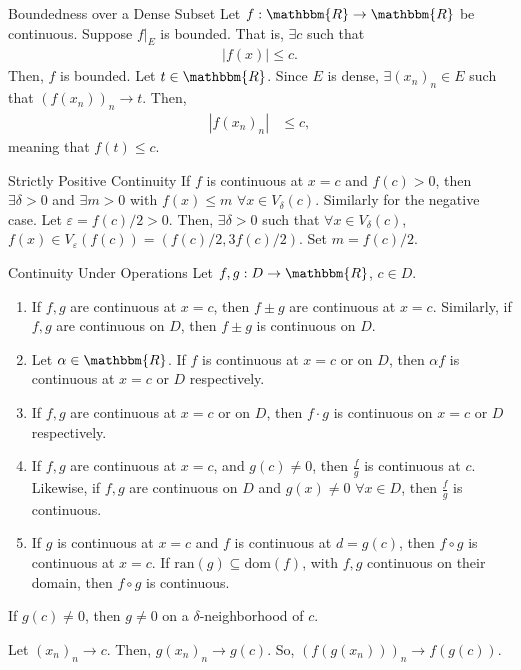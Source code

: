 \documentclass[10pt]{extarticle}
\newcommand{\R}{\mathbbm{R}}
\begin{document}
  \begin{problem}{Boundedness over a Dense Subset}
    Let $f: \R \rightarrow \R$ be continuous. Suppose $f\vert_{E}$ is bounded. That is, $\exists c$ such that
    \begin{align*}
      |f(x)| \leq c.\tag*{$\forall x\in E$}
    \end{align*}
    Then, $f$ is bounded.
    \tcblower
    Let $t\in \R$. Since $E$ is dense, $\exists (x_n)_n \in E$ such that $(f(x_n))_n \rightarrow t$. Then,
    \begin{align*}
      |f(x_n)_n| &\leq c,
    \end{align*}
    meaning that $f(t) \leq c$.
  \end{problem}
  \begin{problem}{Strictly Positive Continuity}
    If $f$ is continuous at $x=c$ and $f(c) > 0$, then $\exists \delta > 0$ and $\exists m > 0$ with $f(x) \leq m$ $\forall x \in V_{\delta}(c)$. Similarly for the negative case.
    \tcblower
    Let $\varepsilon = f(c) / 2 > 0$. Then, $\exists \delta > 0$ such that $\forall x\in V_{\delta}(c)$, $f(x)\in V_{\varepsilon}(f(c)) = (f(c)/2,3f(c)/2)$. Set $m = f(c)/2$. 
  \end{problem}
  \begin{problem}{Continuity Under Operations}
    Let $f,g: D\rightarrow \R$, $c\in D$.
    \begin{enumerate}[(1)]
      \item If $f,g$ are continuous at $x = c$, then $f\pm g$ are continuous at $x=c$. Similarly, if $f,g$ are continuous on $D$, then $f\pm g$ is continuous on $D$.
      \item Let $\alpha \in \R$. If $f$ is continuous at $x=c$ or on $D$, then $\alpha f$ is continuous at $x=c$ or $D$ respectively.
      \item If $f,g$ are continuous at $x=c$ or on $D$, then $f\cdot g$ is continuous on $x=c$ or $D$ respectively.
      \item If $f,g$ are continuous at $x=c$, and $g(c) \neq 0$, then $\frac{f}{g}$ is continuous at $c$. Likewise, if $f,g$ are continuous on $D$ and $g(x)\neq 0$ $\forall x\in D$, then $\frac{f}{g}$ is continuous.
      \item If $g$ is continuous at $x=c$ and $f$ is continuous at $d=g(c)$, then $f\circ g$ is continuous at $x=c$. If $\text{ran}(g) \subseteq \text{dom}(f)$, with $f,g$ continuous on their domain, then $f\circ g$ is continuous.
    \end{enumerate}
    \tcblower
    \begin{description}[font=\normalfont]
      \item[Remark on (4):] If $g(c) \neq 0$, then $g\neq 0$ on a $\delta$-neighborhood of $c$.
      \item[Proof of (5):] Let $(x_n)_n \rightarrow c$. Then, $g(x_n)_n \rightarrow g(c)$. So, $(f(g(x_n)))_n \rightarrow f(g(c))$.
    \end{description}
  \end{problem}
\end{document}
